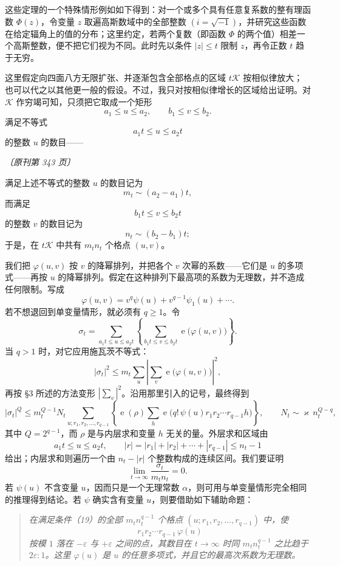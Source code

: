 \documentclass[UTF8,11pt,a4paper,fontset=none]{ctexart}
\theoremstyle{weylthm}
\newcommand{\e}{\operatorname{e}}
\newcommand{\origpage}[1]{%
  \par\vspace{0.7em}\noindent\hfill{\small\itshape〔原刊第 #1 页〕}\par\vspace{0.25em}}
\begin{document}
这些定理的一个特殊情形例如如下得到：对一个或多个具有任意复系数的整有理函数
\(\Phi(z)\)，令变量 \(z\) 取遍高斯数域中的全部整数
\((i=\sqrt{-1})\)，并研究这些函数在给定辐角上的值的分布；这里约定，若两个复数（即函数
\(\Phi\) 的两个值）相差一个高斯整数，便不把它们视为不同。此时先以条件
\(|z|\leq t\) 限制 \(z\)，再令正数 \(t\) 趋于无穷。

这里假定向四面八方无限扩张、并逐渐包含全部格点的区域
\(t\mathcal K\) 按相似律放大；也可以代之以其他更一般的假设。不过，我只对按相似律增长的区域给出证明。对
\(\mathcal K\) 作穷竭可知，只须把它取成一个矩形
\[
  a_1\leq u\leq a_2,
  \qquad
  b_1\leq v\leq b_2.
\]
满足不等式
\[
  a_1t\leq u\leq a_2t
\]
的整数 \(u\) 的数目——


\origpage{343}

满足上述不等式的整数 \(u\) 的数目记为
\[
  m_t\sim(a_2-a_1)t,
\]
而满足
\[
  b_1t\leq v\leq b_2t
\]
的整数 \(v\) 的数目记为
\[
  n_t\sim(b_2-b_1)t;
\]
于是，在 \(t\mathcal K\) 中共有 \(m_tn_t\) 个格点 \((u,v)\)。

我们把 \(\varphi(u,v)\) 按 \(v\) 的降幂排列，并把各个 \(v\) 次幂的系数——它们是 \(u\) 的多项式——再按 \(u\) 的降幂排列。假定在这种排列下最高项的系数为无理数，并不造成任何限制。写成
\[
  \varphi(u,v)=v^q\psi(u)+v^{q-1}\psi_1(u)+\cdots.
\]
若不想退回到单变量情形，就必须有 \(q\geq1\)。令
\[
  \sigma_t=
  \sum_{a_1t\leq u\leq a_2t}
  \left\{
  \sum_{b_1t\leq v\leq b_2t}\e\bigl(\varphi(u,v)\bigr)
  \right\}.
\]
当 \(q>1\) 时，对它应用施瓦茨不等式：
\[
  |\sigma_t|^2
  \leq m_t\sum_u\left|\sum_v\e\bigl(\varphi(u,v)\bigr)\right|^2,
\]
再按 §3 所述的方法变形 \(\left|\sum_v\right|^2\)。沿用那里引入的记号，最终得到
\begin{equation}
  |\sigma_t|^Q
  \leq
  m_t^{Q-1}N_t
  \sum_{u;r_1,r_2,\ldots,r_{q-1}}
  \left\{
    \e(\rho)
    \sum_h
    \e\bigl(q!\,\psi(u)r_1r_2\cdots r_{q-1}h\bigr)
  \right\},
  \qquad
  N_t\sim\varkappa\,n_t^{Q-q},
  \tag{18}
\end{equation}
其中 \(Q=2^{q-1}\)，而 \(\rho\) 是与内层求和变量 \(h\) 无关的量。外层求和区域由
\begin{equation}
  a_1t\leq u\leq a_2t,
  \qquad
  |r|=|r_1|+|r_2|+\cdots+|r_{q-1}|\leq n_t-1
  \tag{19}
\end{equation}
给出；内层求和则遍历一个由 \(n_t-|r|\) 个整数构成的连续区间。我们要证明
\[
  \lim_{t\to\infty}\frac{\sigma_t}{m_tn_t}=0.
\]
若 \(\psi(u)\) 不含变量 \(u\)，因而只是一个无理常数 \(\alpha\)，则可用与单变量情形完全相同的推理得到结论。若 \(\psi\) 确实含有变量 \(u\)，则要借助如下辅助命题：

\begin{quote}\itshape
在满足条件（19）的全部 \(m_tn_t^{q-1}\) 个格点
\((u;r_1,r_2,\ldots,r_{q-1})\) 中，使
\[
  r_1r_2\cdots r_{q-1}\,\varphi(u)
\]
按模 \(1\) 落在 \(-\varepsilon\) 与 \(+\varepsilon\) 之间的点，其数目在
\(t\to\infty\) 时同 \(m_tn_t^{q-1}\) 之比趋于 \(2\varepsilon:1\)。这里
\(\varphi(u)\) 是 \(u\) 的任意多项式，并且它的最高次系数为无理数。
\end{quote}
\end{document}
